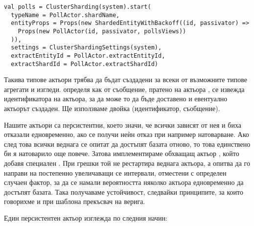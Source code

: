 \begin{lstlisting}
val polls = ClusterSharding(system).start(
  typeName = PollActor.shardName,
  entityProps = Props(new ShardedEntityWithBackoff((id, passivator) =>
    Props(new PollActor(id, passivator, pollsViews))
  )),
  settings = ClusterShardingSettings(system),
  extractEntityId = PollActor.extractEntityId,
  extractShardId = PollActor.extractShardId)
\end{lstlisting}

Такива типове актьори трябва да бъдат създадени за всеки от възможните типове агрегати и изгледи.  определя как от съобщение, пратено на актьора , се извежда идентификатора на актьора, за да може то да бъде доставено и евентуално актьорът създаден. Ще използваме двойка (идентификатор, съобщение).

Нашите актьори са персистентни, което значи, че всички зависят от нея и биха отказали едновременно, ако се получи неѝн отказ при например натоварване. Ако след това всички веднага се опитат да достъпят базата отново, то това единствено би я натоварило още повече. Затова имплементираме обхващащ актьор , който добавя специален . При грешки той не рестартира веднага актьора, а опитва да го направи на постепенно увеличаващи се интервали, отместени с определен случаен фактор, за да се намали вероятността няколко актьора едновременно да достъпят базата. Така получаваме устойчивост, следвайки принципите, за които говорихме и при шаблона прекъсвач на верига.

Един персистентен актьор изглежда по следния начин:

